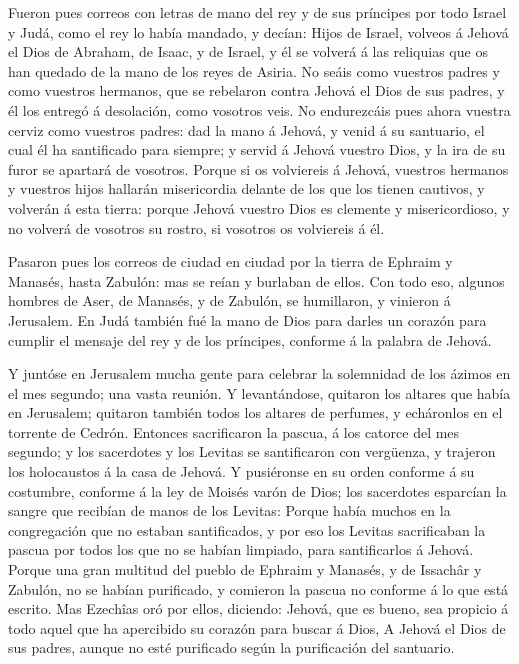  Fueron pues correos con letras de mano del rey y de sus
príncipes por todo Israel y Judá, como el rey lo había mandado, y
decían: Hijos de Israel, volveos á Jehová el Dios de Abraham, de Isaac,
y de Israel, y él se volverá á las reliquias que os han quedado de la
mano de los reyes de Asiria.  No seáis como vuestros padres
y como vuestros hermanos, que se rebelaron contra Jehová el Dios de sus
padres, y él los entregó á desolación, como vosotros veis. 
No endurezcáis pues ahora vuestra cerviz como vuestros padres: dad la
mano á Jehová, y venid á su santuario, el cual él ha santificado para
siempre; y servid á Jehová vuestro Dios, y la ira de su furor se
apartará de vosotros.  Porque si os volviereis á Jehová,
vuestros hermanos y vuestros hijos hallarán misericordia delante de los
que los tienen cautivos, y volverán á esta tierra: porque Jehová vuestro
Dios es clemente y misericordioso, y no volverá de vosotros su rostro,
si vosotros os volviereis á él.

 Pasaron pues los correos de ciudad en ciudad por la tierra
de Ephraim y Manasés, hasta Zabulón: mas se reían y burlaban de ellos.
 Con todo eso, algunos hombres de Aser, de Manasés, y de
Zabulón, se humillaron, y vinieron á Jerusalem.  En Judá
también fué la mano de Dios para darles un corazón para cumplir el
mensaje del rey y de los príncipes, conforme á la palabra de Jehová.

 Y juntóse en Jerusalem mucha gente para celebrar la
solemnidad de los ázimos en el mes segundo; una vasta reunión.
 Y levantándose, quitaron los altares que había en
Jerusalem; quitaron también todos los altares de perfumes, y echáronlos
en el torrente de Cedrón.  Entonces sacrificaron la pascua,
á los catorce del mes segundo; y los sacerdotes y los Levitas se
santificaron con vergüenza, y trajeron los holocaustos á la casa de
Jehová.  Y pusiéronse en su orden conforme á su costumbre,
conforme á la ley de Moisés varón de Dios; los sacerdotes esparcían la
sangre que recibían de manos de los Levitas:  Porque había
muchos en la congregación que no estaban santificados, y por eso los
Levitas sacrificaban la pascua por todos los que no se habían limpiado,
para santificarlos á Jehová.  Porque una gran multitud del
pueblo de Ephraim y Manasés, y de Issachâr y Zabulón, no se habían
purificado, y comieron la pascua no conforme á lo que está escrito. Mas
Ezechîas oró por ellos, diciendo: Jehová, que es bueno, sea propicio á
todo aquel que ha apercibido su corazón para buscar á Dios,
 A Jehová el Dios de sus padres, aunque no esté purificado
según la purificación del santuario.

